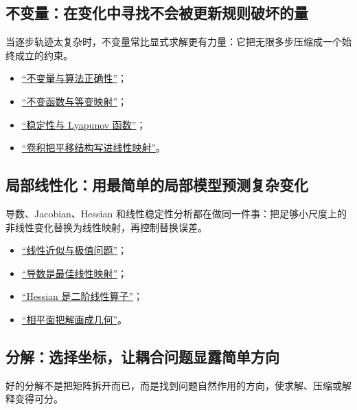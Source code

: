 \subsection{不变量：在变化中寻找不会被更新规则破坏的量}

当逐步轨迹太复杂时，不变量常比显式求解更有力量：它把无限多步压缩成一个始终成立的约束。

\begin{itemize}
\tightlist
\item \hyperref[sec:01-Mathematical-Language/04-Induction-and-Recursion/04]{``不变量与算法正确性''}；
\item \hyperref[sec:04-Discrete-Mathematics/06-Groups-and-Symmetry/04]{``不变函数与等变映射''}；
\item \hyperref[sec:15-Differential-Equations-and-Dynamical-Systems/02-Stability-and-Dynamical-Systems/02]{``稳定性与 Lyapunov 函数''}；
\item \hyperref[sec:14-Deep-Learning/04-Convolutional-Networks/01]{``卷积把平移结构写进线性映射''}。
\end{itemize}

\subsection{局部线性化：用最简单的局部模型预测复杂变化}

导数、Jacobian、Hessian 和线性稳定性分析都在做同一件事：把足够小尺度上的非线性变化替换为线性映射，再控制替换误差。

\begin{itemize}
\tightlist
\item \hyperref[sec:02-Calculus/03-Differentiation/05]{``线性近似与极值问题''}；
\item \hyperref[sec:10-Matrix-Calculus/01-Derivative-Conventions/01]{``导数是最佳线性映射''}；
\item \hyperref[sec:10-Matrix-Calculus/02-Differentials/03]{``Hessian 是二阶线性算子''}；
\item \hyperref[sec:15-Differential-Equations-and-Dynamical-Systems/02-Stability-and-Dynamical-Systems/01]{``相平面把解画成几何''}。
\end{itemize}

\subsection{分解：选择坐标，让耦合问题显露简单方向}

好的分解不是把矩阵拆开而已，而是找到问题自然作用的方向，使求解、压缩或解释变得可分。

